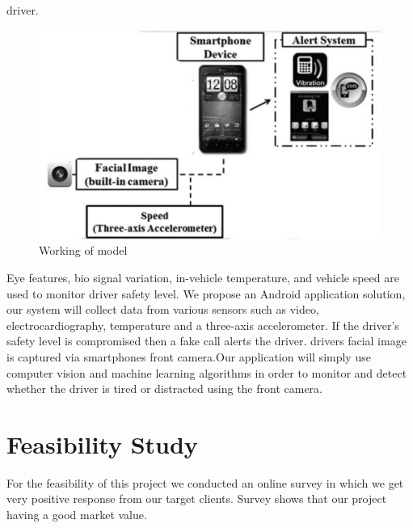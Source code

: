 driver.\\ [0.5cm]
\begin{figure}
    \centering
    \includegraphics[width= 15cm]{./figures/work.jpg}
    \caption{\label{Fid:1} Working of model}
  
\end{figure}



Eye features, bio signal variation, in-vehicle temperature, and vehicle speed are used to monitor
driver safety level. We propose an Android application solution, our system will collect data from
various sensors such as video, electrocardiography, temperature and a three-axis
accelerometer. If the driver's safety level is compromised then a fake call alerts the driver.
drivers facial image is captured via smartphones front camera.Our application will simply use
computer vision and machine learning algorithms in order to monitor and detect whether the
driver is tired or distracted using the front camera.

\chapter{Feasibility Study}
For the feasibility of this project we conducted an online survey in which we get very positive response
from our target clients. Survey shows that our project having a good market value.
